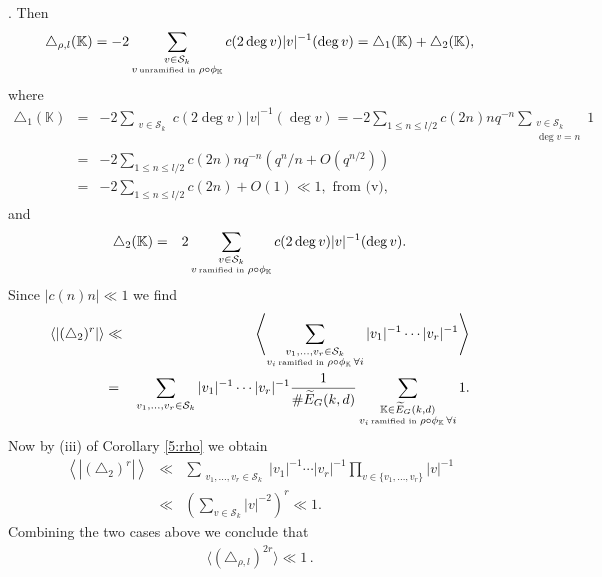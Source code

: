 \documentclass[12pt]{amsart}
\theoremstyle{plain}
\begin{document}
. Then
\[\triangle_{\rho,l}({{\mathbb K}}) =-2 \sum_{\substack{v \in {\mathcal{S}_k}\\
v \, \mbox{\tiny unramified in } \rho \circ {\phi_{{\mathbb K}}}}} c(2 \deg v) |v|^{-1} (\deg v) =\triangle_{1}({{\mathbb K}})+\triangle_{2}({{\mathbb K}}), \]
where
\begin{eqnarray*} \triangle_{1}({{\mathbb K}})&=&-2 \sum_{\substack{v \in {\mathcal{S}_k}}} c(2 \deg v) |v|^{-1} (\deg v)
=-2 \sum_{1 \le n \le l/2}c(2n) n q^{-n} \sum_{\substack{v \in {\mathcal{S}_k}\\
\deg v =n}}1 \\
&=& -2 \sum_{1 \le n \le l/2}c(2n) n q^{-n} \left(q^n/n+O(q^{n/2})\right) \\
&=& -2 \sum_{1 \le n \le l/2} c(2n)+O(1) \ll 1, \mbox{ from (v)}, \end{eqnarray*}
and
\begin{eqnarray*} \triangle_{2}({{\mathbb K}})&=&2 \sum_{\substack{v \in {\mathcal{S}_k}\\
v \, \mbox{\tiny ramified in } \rho \circ {\phi_{{\mathbb K}}}}} c(2 \deg v) |v|^{-1} (\deg v).
\end{eqnarray*}
Since $|c(n)n| \ll 1$ we find
\begin{eqnarray*} \left \langle \left|(\triangle_{2})^r\right| \right \rangle & \ll & \left \langle \sum_{\substack{v_1,\ldots,v_r \in {\mathcal{S}_k}\\
v_i \, \mbox{\tiny ramified in } \rho \circ {\phi_{{\mathbb K}}} \, \forall i}} |v_1|^{-1} \cdots |v_r|^{-1} \right \rangle \\
&=& \sum_{\substack{v_1,\ldots,v_r \in {\mathcal{S}_k}
}} |v_1|^{-1} \cdots |v_r|^{-1} \frac{1}{\# \widetilde{E}_G(k,d)} \sum_{\substack{{{\mathbb K}} \in \widetilde{E}_G(k,d)\\
v_i \, \mbox{\tiny ramified in } \rho \circ {\phi_{{\mathbb K}}} \, \forall i}} 1.
\end{eqnarray*}
Now by (iii) of Corollary \ref{5:rho} we obtain
\begin{eqnarray*} \left \langle \left|(\triangle_{2})^r\right| \right \rangle & \ll & \sum_{\substack{v_1,\ldots,v_r \in {\mathcal{S}_k}
}} |v_1|^{-1} \cdots |v_r|^{-1} \prod_{v \in \{v_1,\ldots,v_r\}} |v|^{-1} \\
& \ll & \left(\sum_{v \in {\mathcal{S}_k}} |v|^{-2}\right)^r \ll 1.
\end{eqnarray*}
Combining the two cases above we conclude that
\begin{eqnarray} \label{3:tri} \langle (\triangle_{\rho,l})^{2r} \rangle \ll 1\,. \end{eqnarray}
\end{document}
